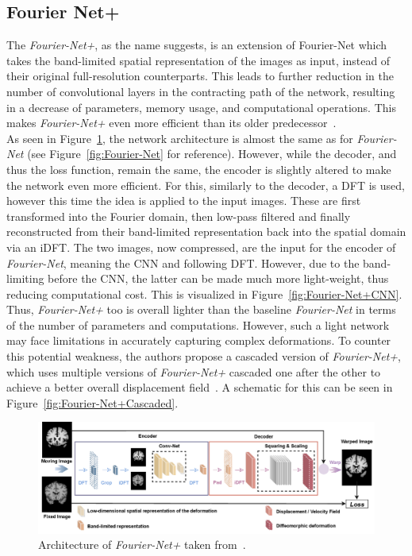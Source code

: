 \documentclass[english,version-2022-01]{uzl-thesis} %
\begin{document}
\subsection{Fourier Net+}
The \emph{Fourier-Net+}, as the name suggests, is an extension of Fourier-Net which takes the band-limited spatial representation of the images as input, instead of their original full-resolution counterparts. This leads to further reduction in the number of convolutional layers in the contracting path of the network, resulting in a decrease of parameters, memory usage, and computational operations. This makes \emph{Fourier-Net+} even more efficient than its older predecessor~\cite{Fourier-Net+}.\\
As seen in Figure~\ref{fig:Fourier-Net+}, the network architecture is almost the same as for \emph{Fourier-Net} (see Figure~\ref{fig:Fourier-Net} for reference). However, while the decoder, and thus the loss function, remain the same, the encoder is slightly altered to make the network even more efficient. For this, similarly to the decoder, a DFT is used, however this time the idea is applied to the input images. These are first transformed into the Fourier domain, then low-pass filtered and finally reconstructed from their band-limited representation back into the spatial domain via an iDFT. The two images, now compressed, are the input for the encoder of \emph{Fourier-Net}, meaning the CNN and following DFT. However, due to the band-limiting before the CNN, the latter can be made much more light-weight, thus reducing computational cost. This is visualized in Figure~\ref{fig:Fourier-Net+CNN}. Thus, \emph{Fourier-Net+} too is overall lighter than the baseline \emph{Fourier-Net} in terms of the number of parameters and computations. However, such a light network may face limitations in accurately capturing complex deformations. To counter this potential weakness, the authors propose a cascaded version of \emph{Fourier-Net+}, which uses multiple versions of \emph{Fourier-Net+} cascaded one after the other to achieve a better overall displacement field~\cite{Fourier-Net+}. A schematic for this can be seen in Figure~\ref{fig:Fourier-Net+Cascaded}.

\begin{figure}[htpb]
	\centering
	\graphicspath{{images/}{\main/images/}}
	\includegraphics[width=\linewidth]{ArchitectureFourier-Net+.png} 
	\caption{Architecture of \emph{Fourier-Net+} taken from~\cite{Fourier-Net+}.}
	\label{fig:Fourier-Net+}
\end{figure}
\end{document}
